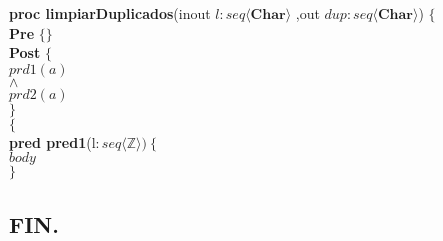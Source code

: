 \documentclass[a4paper]{article}
\begin{document}
\begin{enumerate}[label=\alph*)]
			\textbf{proc limpiarDuplicados}(inout $l: seq\langle \mathbb{\textbf{Char}}\rangle$
			,out $dup:seq\langle \mathbb{\textbf{Char}}\rangle$)
			$\{$\smallskip \\
			\hspace*{6mm} \textbf{Pre }$\{ \}$\smallskip \\
			\hspace*{6mm} \textbf{Post }$\{$\\
			\hspace*{6mm} $prd1(a)$\\
			\hspace*{6mm} $\wedge$\\
			\hspace*{6mm} $prd2(a)$\\
			\hspace*{6mm} $\}$\\
			$\{$\smallskip \\
			
			\textbf{pred pred1}(l$: seq\langle \mathbb{Z}\rangle)\ \{$\smallskip \\
			\hspace*{6mm}$body$\\
			$\}$
	\end{enumerate}

\begin{center}
\section*{FIN.}
\end{center}
\end{document}
